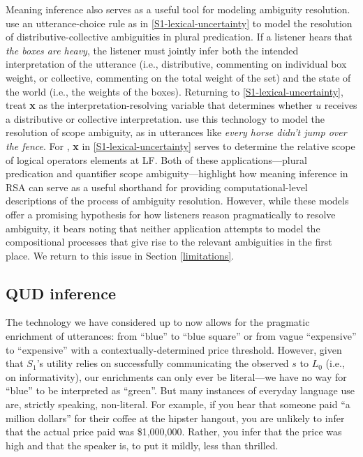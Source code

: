 \documentclass{sp}
\begin{document}
Meaning inference also serves as a useful tool for modeling ambiguity resolution. \cite{scontrasgoodman2017} use an utterance-choice rule as in \eqref{S1-lexical-uncertainty} to model the resolution of distributive-collective ambiguities in plural predication. If a listener hears that \emph{the boxes are heavy}, the listener must jointly infer both the intended interpretation of the utterance (i.e., distributive, commenting on individual box weight, or collective, commenting on the total weight of the set) and the state of the world (i.e., the weights of the boxes). Returning to \eqref{S1-lexical-uncertainty}, \citeauthor{scontrasgoodman2017} treat \textbf{x} as the interpretation-resolving variable that determines whether $u$ receives a distributive or collective interpretation. \cite{savinellietal2017,savinellietal2018} use this technology to model the resolution of scope ambiguity, as in utterances like \emph{every horse didn't jump over the fence}. For \citeauthor{savinellietal2017}, \textbf{x} in \eqref{S1-lexical-uncertainty} serves to determine the relative scope of logical operators elements at LF. 
Both of these applications---plural predication and quantifier scope ambiguity---highlight how meaning inference in RSA can serve as a useful shorthand for providing computational-level descriptions of the process of ambiguity resolution. However, while these models offer a promising hypothesis for how listeners reason pragmatically to resolve ambiguity, it bears noting that neither application attempts to model the compositional processes that give rise to the relevant ambiguities in the first place. We return to this issue in Section \ref{limitations}.


\subsection{QUD inference}

The technology we have considered up to now allows for the pragmatic enrichment of utterances: from ``blue'' to ``blue square'' or from vague ``expensive'' to ``expensive'' with a contextually-determined price threshold. However, given that $S_1$'s utility relies on successfully communicating the observed $s$ to $L_0$ (i.e., on informativity), our enrichments can only ever be literal---we have no way for ``blue'' to be interpreted as ``green''. But many instances of everyday language use are, strictly speaking, non-literal. For example, if you hear that someone paid ``a million dollars'' for their coffee at the hipster hangout, you are unlikely to infer that the actual price paid was \$1,000,000. Rather, you infer that the price was high and that the speaker is, to put it mildly, less than thrilled.
\end{document}
